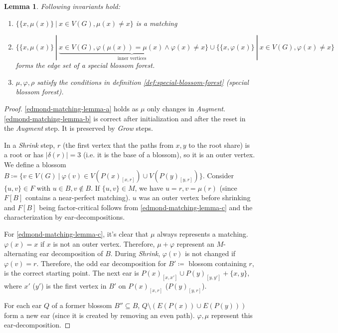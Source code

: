 \documentclass[11pt, a4paper]{article}
\newcommand{\abs}[1]{\left\lvert#1\right\rvert}
\newcommand{\set}[1]{\{#1\}}
\newtheorem{lemma}[theorem]{Lemma}
\theoremstyle{remark}
\theoremstyle{definition}
\begin{document}
\begin{lemma}
	Following invariants hold:
	\begin{enumerate}[label=\alph*)]\label{edmond-matching-lemma}
		\item $\set{\set{x,\mu(x)}\ |\ x\in V(G),\mu(x)\neq x}$ is a matching
		\label{edmond-matching-lemma-a}

		\item $\set{\set{x,\mu(x)}\ |\ \underbrace{x\in
				V(G),\varphi(\mu(x))=\mu(x) \land \varphi(x)\neq x}
			_{\text{inner vertices}}
			}\cup\set{\set{x,\varphi(x)}\ |\ x\in V(G), \varphi(x)\neq x}$
		forms the edge set of a special blossom forest.
		\label{edmond-matching-lemma-b}

		\item $\mu,\varphi,\rho$ satisfy the conditions in definition
		\ref{def:special-blossom-forest} (special blossom forest).
		\label{edmond-matching-lemma-c}
	\end{enumerate}
\end{lemma}

\begin{proof}
	\ref{edmond-matching-lemma-a} holds as $\mu$ only changes in \emph{Augment}.
	\ref{edmond-matching-lemma-b} is correct after initialization and after
	the reset in the \emph{Augment} step. It is preserved by \emph{Grow} steps.

	In a \emph{Shrink} step, $r$ (the first vertex that the paths from
	$x,y$ to the root share) is a root or has $\abs{\delta(r)}=3$ (i.e.
	it is the base of a blossom), so it is an outer vertex. We define a
	blossom $B\coloneqq \set{v\in V(G)\ |\ \varphi(v)\in
			V(P(x)_{[x,r]})\cup V(P(y)_{[y,r]})}$. Consider $\set{u,v}\in F$ with
	$u\in B, v\notin B$. If $\set{u,v}\in M$, we have $u=r, v=\mu(r)$
	(since $F[B]$ contains a near-perfect matching). $u$ was an outer
	vertex before shrinking and $F[B]$ being factor-critical follows from
	\ref{edmond-matching-lemma-c} and the characterization by
	ear-decompositions.

	For \ref{edmond-matching-lemma-c}, it's clear that $\mu$ always
	represents a matching. $\varphi(x)=x$ if $x$ is not an outer vertex.
	Therefore, $\mu+\varphi$ represent an $M$-alternating ear
	decomposition of $B$. During \emph{Shrink}, $\varphi(v)$ is not
	changed if $\varphi(v)=r$. Therefore, the odd ear decomposition for
	$B'\coloneqq$ blossom containing $r$, is the correct starting point.
	The next ear is $P(x)_{[x,x']}\cup P(y)_{[y,y']} +\set{x,y}$, where
	$x'$ ($y'$) is the first vertex in $B'$ on $P(x)_{[x,r]}$
	($P(y)_{[y,r]}$).

	For each ear $Q$ of a former blossom $B''\subseteq B$, $Q\setminus
		\left(E(P(x))\cup E(P(y))\right)$ form a new ear (since it is created
	by removing an even path). $\varphi,\mu$ represent this
	ear-decomposition.
\end{proof}
\end{document}
